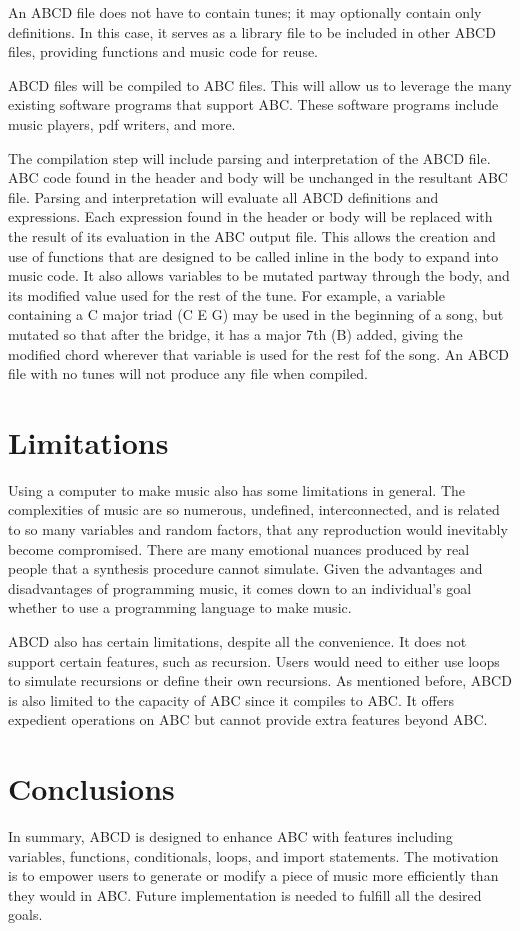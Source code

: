 An ABCD file does not have to contain tunes; it may optionally contain only definitions. In this case, it serves as a library file to be included in other ABCD files, providing functions and music code for reuse.
	
ABCD files will be compiled to ABC files. This will allow us to leverage the many existing software programs that support ABC\cite{Walshaw17}. These software programs include music players, pdf writers, and more.

The compilation step will include parsing and interpretation of the ABCD file. ABC code found in the header and body will be unchanged in the resultant ABC file. Parsing and interpretation will evaluate all ABCD definitions and expressions. Each expression found in the header or body will be replaced with the result of its evaluation in the ABC output file. This allows the creation and use of functions that are designed to be called inline in the body to expand into music code. It also allows variables to be mutated partway through the body, and its modified value used for the rest of the tune. For example, a variable containing a C major triad (C E G) may be used in the beginning of a song, but mutated so that after the bridge, it has a major 7th (B) added, giving the modified chord wherever that variable is used for the rest fof the song. An ABCD file with no tunes will not produce any file when compiled.

\section{Limitations}
Using a computer to make music also has some limitations in general. The complexities of music are so numerous, undefined, interconnected, and is related to so many variables and random factors, that any reproduction would inevitably become compromised. There are many emotional nuances produced by real people that a synthesis procedure cannot simulate\cite{Dobrian88}.  Given the advantages and disadvantages of programming music, it comes down to an individual's goal whether to use a programming language to make music. 

ABCD also has certain limitations, despite all the convenience. It does not support certain features, such as recursion. Users would need to either use loops to simulate recursions or define their own recursions. As mentioned before, ABCD is also limited to the capacity of ABC since it compiles to ABC. It offers expedient operations on ABC but cannot provide extra features beyond ABC.

\section{Conclusions}
In summary, ABCD is designed to enhance ABC with features including variables, functions, conditionals, loops, and import statements. The motivation is to empower users to generate or modify a piece of music more efficiently than they would in ABC.  Future implementation is needed to fulfill all the desired goals.
